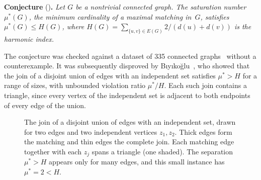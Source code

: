 \documentclass[11pt]{article}
\theoremstyle{definition}
\theoremstyle{remark}
\newcommand{\mustar}{\mu^{*}}
\begin{document}
\medskip
\noindent\textbf{Conjecture}
(\cite[Conjecture~4]{Davila2025reverie})\textbf{.}
\textit{Let $G$ be a nontrivial connected graph.  The saturation
number~$\mustar(G)$, the minimum cardinality of a maximal matching in~$G$,
satisfies $\mustar(G) \le H(G)$, where
$H(G) = \sum_{\{u,v\} \in E(G)} 2/(d(u)+d(v))$ is the harmonic index.}
\medskip

\noindent
The conjecture was checked against a dataset of 335 connected
graphs~\cite{Davila2025reverie} without a counterexample.  It was
subsequently disproved by
B\i y\i ko\u{g}lu~\cite{Biyikoglu2026note}, who showed that the join of a
disjoint union of edges with an independent set satisfies $\mustar > H$ for
a range of sizes, with unbounded violation ratio $\mustar/H$.  Each such join
contains a triangle, since every vertex of the independent set is adjacent to
both endpoints of every edge of the union.

\begin{figure}[ht]
\centering
{}
\caption{The join of a disjoint union of edges with an independent set, drawn
for two edges and two independent vertices $z_1, z_2$.  Thick edges form the
matching and thin edges the complete join.  Each matching edge together with each
$z_j$ spans a triangle (one shaded).  The separation $\mustar > H$ appears
only for many edges, and this small instance has $\mustar = 2 < H$.}
\label{fig:join}
\end{figure}
\end{document}
